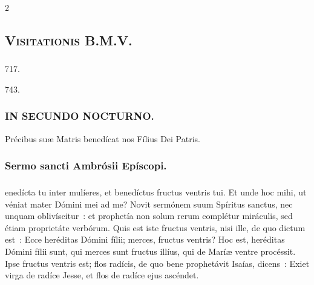 \documentclass[9pt,twoside]{extarticle}
\begin{document}
\begin{multicols}{2}
{{\subsection*{\center \textsc{Visitationis B.M.V.}}
\subsubsection*{\center {}}

\begin{tightlist}{}
\item {}
\item {} 717.
\item {} 743.
\item {}
\item {}
\end{tightlist}

\subsubsection*{\center \textsc{IN SECUNDO NOCTURNO.}}
\begin{tightlist}{}
\item {} Précibus suæ Matris benedícat nos Fílius Dei Patris.
\end{tightlist}

\subsubsection*{\center Sermo sancti Ambrósii Epíscopi.}
\subsubsection*{\center {}}
enedícta tu inter mulíeres, et benedíctus fructus ventris tui. Et unde hoc mihi, ut véniat mater Dómini mei ad me? Novit sermónem suum Spíritus sanctus, nec unquam oblivíscitur~: et prophetía non solum rerum complétur miráculis, sed étiam proprietáte verbórum. Quis est iste fructus ventris, nisi ille, de quo dictum est~: Ecce heréditas Dómini fílii; merces, fructus ventris? Hoc est, heréditas Dómini fílii sunt, qui merces sunt fructus illíus, qui de Maríæ ventre procéssit. Ipse fructus ventris est; flos radícis, de quo bene prophetávit Isaías, dicens~: Exiet virga de radíce Jesse, et flos de radíce ejus ascéndet.

}}
\end{multicols}
\end{document}
